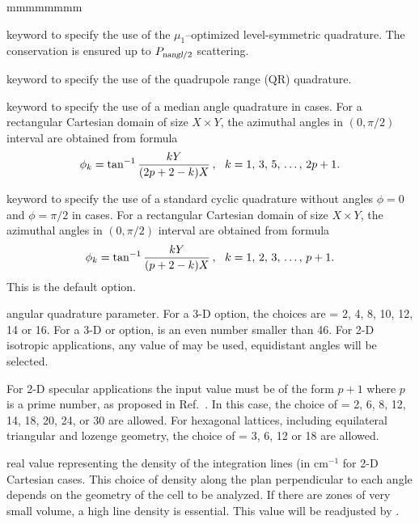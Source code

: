 \begin{ListeDeDescription}{mmmmmmmm}
\item[\moc{LSN}] keyword to specify the use of the $\mu_1$--optimized level-symmetric quadrature. The conservation is ensured up to $P_{\dusa{nangl}/2}$ scattering.

\item[\moc{QRN}] keyword to specify the use of the quadrupole range (QR) quadrature.\cite{quadrupole}

\item[\moc{MEDI}] keyword to specify the use of a median angle quadrature in  cases. For
a rectangular Cartesian domain of size $X \times Y$, the azimuthal angles in $(0,\pi/2)$ interval are obtained from formula
$$
\phi_k=\tan^{-1}{\displaystyle kY\over\displaystyle (2p+2-k)X} \, , \ \ k=1,\, 3,\, 5, \, \dots, \, 2p+1 .
$$

\item[\moc{EQW2}] keyword to specify the use of a standard cyclic quadrature without angles $\phi=0$ and $\phi=\pi/2$ in  cases. For
a rectangular Cartesian domain of size $X \times Y$, the azimuthal angles in $(0,\pi/2)$ interval are obtained from formula
$$
\phi_k=\tan^{-1}{\displaystyle k Y\over\displaystyle (p+2-k)X} \, , \ \ k=1,\, 2,\, 3, \, \dots, \, p+1 .
$$
This is the default option.

\item[\dusa{nangl}] angular quadrature parameter. For a 3-D  option, the choices are  = 2, 4, 8, 10, 12, 14 
or 16. For a 3-D  or  option,  is an even number smaller than 46.\cite{ige260} For 2-D 
isotropic applications, any value of  may be used, equidistant angles will be selected.

For 2-D specular applications the input value must be of the form $p + 1$ where $p$ is a prime number, as proposed
in Ref.~. In this case, the choice of  = 2, 6, 8, 12, 14, 18, 20, 24, or 30 are allowed. For hexagonal lattices,
including equilateral triangular and lozenge geometry, the choice of  = 3, 6, 12 or 18 are allowed.

\item[\dusa{dens}] real value representing the density of the integration lines (in cm$^{-1}$ for 2-D Cartesian cases.
This choice of density along the plan perpendicular to each angle depends on the geometry of the cell to be analyzed. If there 
are zones of very small volume, a high line density is essential. This value will be readjusted by 
.


\end{ListeDeDescription}
